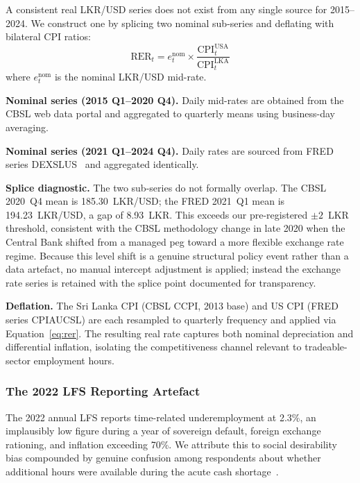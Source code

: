 \documentclass[sigconf]{acmart}
\begin{document}
A consistent real LKR/USD series does not exist from any single
source for 2015--2024. We construct one by splicing two nominal
sub-series and deflating with bilateral CPI ratios:
%
\begin{equation}
  \text{RER}_t = e_t^{\text{nom}} \times
  \frac{\text{CPI}_t^{\text{USA}}}{\text{CPI}_t^{\text{LKA}}}
  \label{eq:rer}
\end{equation}
%
where $e_t^{\text{nom}}$ is the nominal LKR/USD mid-rate.

\textbf{Nominal series (2015 Q1--2020 Q4).} Daily mid-rates are
obtained from the CBSL web data portal and aggregated to quarterly
means using business-day averaging.

\textbf{Nominal series (2021 Q1--2024 Q4).} Daily rates are sourced
from FRED series DEXSLUS~\cite{cbsl2025,fred2025} and aggregated identically.

\textbf{Splice diagnostic.} The two sub-series do not formally
overlap. The CBSL 2020~Q4 mean is 185.30~LKR/USD; the FRED 2021~Q1
mean is 194.23~LKR/USD, a gap of 8.93~LKR. This exceeds our
pre-registered $\pm 2$~LKR threshold, consistent with the CBSL
methodology change in late 2020 when the Central Bank shifted from a
managed peg toward a more flexible exchange rate regime. Because this
level shift is a genuine structural policy event rather than a data
artefact, no manual intercept adjustment is applied; instead the
exchange rate series is retained with the splice point documented
for transparency.

\textbf{Deflation.} The Sri Lanka CPI (CBSL CCPI, 2013 base) and
US CPI (FRED series CPIAUCSL) are each resampled to quarterly
frequency and applied via Equation~\ref{eq:rer}. The resulting real
rate captures both nominal depreciation and differential inflation,
isolating the competitiveness channel relevant to tradeable-sector
employment hours.

\subsubsection{The 2022 LFS Reporting Artefact}

The 2022 annual LFS reports time-related underemployment at 2.3\%, an
implausibly low figure during a year of sovereign default, foreign
exchange rationing, and inflation exceeding 70\%. We attribute this to
social desirability bias compounded by genuine confusion among
respondents about whether additional hours were available during the
acute cash shortage~\cite{dcs2025}.
\end{document}
